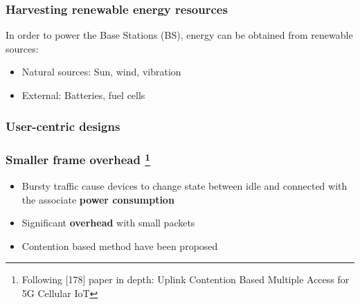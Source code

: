 \documentclass[a4paper,11pt,handout]{beamer}
\begin{document}
\note{

}
\begin{frame}
\frametitle{Harvesting renewable energy resources}
In order to power the Base Stations (BS), energy can be obtained from renewable 
sources:

\begin{itemize}
\item Natural sources: Sun, wind, vibration
\item External: Batteries, fuel cells
\end{itemize}
\end{frame}
\begin{frame}
	\frametitle{User-centric designs}
\end{frame}
\note{}
\begin{frame}
	\frametitle{Smaller frame overhead %
		\footnote{Following [178] paper in depth: Uplink Contention Based Multiple 
		Access for 5G Cellular IoT}%
	}

	\begin{itemize}
		\item Bursty traffic cause devices to change state between idle and 
		connected with the associate \textbf{power consumption}
		\item Significant \textbf{overhead} with small packets
		\item Contention based method have been proposed
		\end{itemize}
\end{frame}
\end{document}

